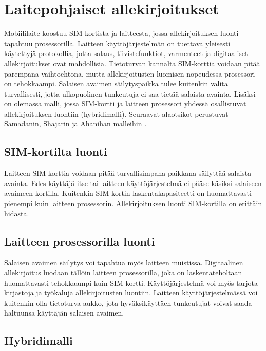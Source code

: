 \documentclass[finnish]{tktltiki2}
\theoremstyle{definition}
\theoremstyle{remark}
\begin{document}
\section{Laitepohjaiset allekirjoitukset}

Mobiililaite koostuu SIM-kortista ja laitteesta, jossa allekirjoituksen luonti tapahtuu prosessorilla. Laitteen käyttöjärjestelmän on tuettava yleisesti käytettyjä protokollia, jotta salaus, tiivistefunktiot, varmenteet ja digitaaliset allekirjoitukset ovat mahdollisia. Tietoturvan kannalta SIM-korttia voidaan pitää parempana vaihtoehtona, mutta allekirjoitusten luomisen nopeudessa prosessori on tehokkaampi. Salaisen avaimen säilytyspaikka tulee kuitenkin valita turvallisesti, jotta ulkopuolinen tunkeutuja ei saa tietää salaista avainta. Lisäksi on olemassa malli, jossa SIM-kortti ja laitteen prosessori yhdessä osallistuvat allekirjoituksen luontiin (hybridimalli). Seuraavat alaotsikot perustuvat Samadanin, Shajarin ja Ahanihan malleihin \cite{proxy}. 
 
\subsection{SIM-kortilta luonti}

Laitteen SIM-korttia voidaan pitää turvallisimpana paikkana säilyttää salaista avainta. Edes käyttäjä itse tai laitteen käyttöjärjestelmä ei pääse käsiksi salaiseen avaimeen kortilla. Kuitenkin SIM-kortin laskentakapasiteetti on huomattavasti pienempi kuin laitteen prosessorin. Allekirjoituksen luonti SIM-kortilla on erittäin hidasta.   

\subsection{Laitteen prosessorilla luonti}

Salaisen avaimen säilytys voi tapahtua myös laitteen muistissa. Digitaalinen allekirjoitus luodaan tällöin laitteen prosessorilla, joka on laskentateholtaan huomattavasti tehokkaampi kuin SIM-kortti. Käyttöjärjestelmä voi myös tarjota kirjastoja ja työkaluja allekirjoitusten luontiin. Laitteen käyttöjärjestelmässä voi kuitenkin olla tietoturva-aukko, jota hyväksikäyttäen tunkeutujat voivat saada haltuunsa käyttäjän salaisen avaimen.

\subsection{Hybridimalli}
\end{document}
